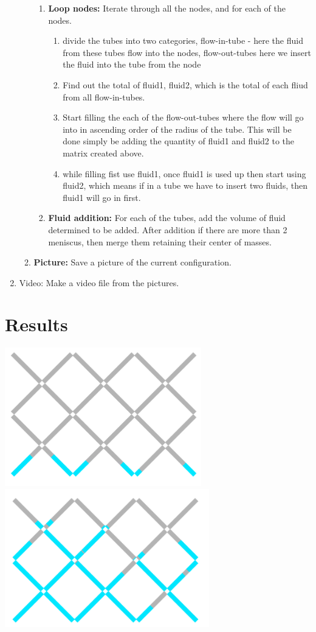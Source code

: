\documentclass[12pt]{article}
\begin{document}
\begin{enumerate}
\begin{enumerate}
\begin{enumerate}
				\item \textbf{Loop nodes:} Iterate through all the nodes, and for each of the nodes. 
					\begin{enumerate}
						\item divide the tubes into two categories, flow-in-tube - here the fluid from these tubes flow into the nodes, flow-out-tubes here we insert the fluid into the tube from the node
						\item Find out the total of fluid1, fluid2, which is the total of each fliud from all flow-in-tubes.
						\item Start filling the each of the flow-out-tubes where the flow will go into in ascending order of the radius of the tube. This will be done simply be adding the quantity of fluid1 and fluid2 to the matrix created above.
						\item while filling fist use fluid1, once fluid1 is used up then start using fluid2, which means if in a tube we have to insert two fluids, then fluid1 will go in first.
					\end{enumerate}
				\item \textbf{Fluid addition:} For each of the tubes, add the volume of fluid determined to be added. After addition if there are more than 2 meniscus, then merge them retaining their center of masses.
				\end{enumerate}
			\item \textbf{Picture:} Save a picture of the current configuration.
			\end{enumerate}
		\item {Video:} Make a video file from the pictures.
	\end{enumerate}

\section{Results}
	\includegraphics[height=6cm]{fig_initial-fill-distribution}
	\includegraphics[height=6cm]{fig_final-fill-distribution}
	
\end{document}
